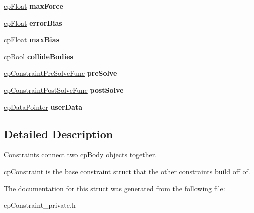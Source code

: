 \begin{DoxyCompactItemize}
\item 
\hypertarget{structcp_constraint_a993d4e5c9439d7b913bd391e955e0e5b}{}\hyperlink{group__basic_types_gac1ed65573e035bf892505768c852d8d3}{cp\+Float} {\bfseries max\+Force}\label{structcp_constraint_a993d4e5c9439d7b913bd391e955e0e5b}

\item 
\hypertarget{structcp_constraint_a4cfd0b995f500090fc5811635ed57614}{}\hyperlink{group__basic_types_gac1ed65573e035bf892505768c852d8d3}{cp\+Float} {\bfseries error\+Bias}\label{structcp_constraint_a4cfd0b995f500090fc5811635ed57614}

\item 
\hypertarget{structcp_constraint_aac8ae38ee220e975dc4abbee86996e62}{}\hyperlink{group__basic_types_gac1ed65573e035bf892505768c852d8d3}{cp\+Float} {\bfseries max\+Bias}\label{structcp_constraint_aac8ae38ee220e975dc4abbee86996e62}

\item 
\hypertarget{structcp_constraint_ab880cb8bb0edf163fdbaf7fd4368ea15}{}\hyperlink{group__basic_types_gabc5e752c48f3449ca26ef413ecbd647e}{cp\+Bool} {\bfseries collide\+Bodies}\label{structcp_constraint_ab880cb8bb0edf163fdbaf7fd4368ea15}

\item 
\hypertarget{structcp_constraint_a4a9e75379d50abaf80662cad350324d6}{}\hyperlink{group__cp_constraint_gaf6038a155d58f45d6ab977dd1b1398de}{cp\+Constraint\+Pre\+Solve\+Func} {\bfseries pre\+Solve}\label{structcp_constraint_a4a9e75379d50abaf80662cad350324d6}

\item 
\hypertarget{structcp_constraint_a1be309feb59902e01cfcaeb5f6696930}{}\hyperlink{group__cp_constraint_ga2208378297a7265d0cc69f31697961b9}{cp\+Constraint\+Post\+Solve\+Func} {\bfseries post\+Solve}\label{structcp_constraint_a1be309feb59902e01cfcaeb5f6696930}

\item 
\hypertarget{structcp_constraint_a4911f2a6b23b6c16fdd00443be4d002f}{}\hyperlink{group__basic_types_ga2ac2c3c31e21893941f9e4f8ee279447}{cp\+Data\+Pointer} {\bfseries user\+Data}\label{structcp_constraint_a4911f2a6b23b6c16fdd00443be4d002f}

\end{DoxyCompactItemize}


\subsection{Detailed Description}
Constraints connect two \hyperlink{structcp_body}{cp\+Body} objects together. 

\hyperlink{structcp_constraint}{cp\+Constraint} is the base constraint struct that the other constraints build off of. 

The documentation for this struct was generated from the following file\+:\begin{DoxyCompactItemize}
\item 
cp\+Constraint\+\_\+private.\+h\end{DoxyCompactItemize}
